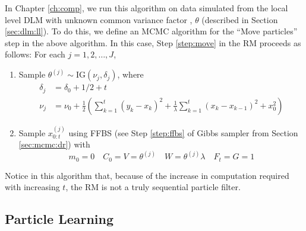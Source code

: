 In Chapter \ref{ch:comp}, we run this algorithm on data simulated from the local level DLM with unknown common variance factor , $\theta$ (described in Section \ref{sec:dlm:ll}). To do this, we define an MCMC algorithm for the ``Move particles'' step in the above algorithm. In this case, Step \ref{step:move} in the RM proceeds as follows:
For each $j = 1,2,\ldots,J$,
\begin{enumerate}
\item \label{step:move:ll} Sample $\theta^{(j)} \sim \mbox{IG}(\nu_j, \delta_j)$, where
\begin{align*}
\delta_j &= \delta_0 + 1/2 + t \\
\nu_j &= \nu_0 + \frac{1}{2}\left(\sum_{k=1}^t (y_k - x_k)^2 + \frac{1}{\lambda}\sum_{k=1}^t (x_k - x_{k-1})^2 + x_0^2\right)
\end{align*}
\item Sample $x_{0:t}^{(j)}$ using FFBS (see Step \ref{step:ffbs} of Gibbs sampler from Section \ref{sec:mcmc:dr}) with
\[m_0 = 0 \quad C_0 = V = \theta^{(j)} \quad W = \theta^{(j)}\lambda \quad F_t = G = 1\]
\end{enumerate}

Notice in this algorithm that, because of the increase in computation required with increasing $t$, the RM is not a truly sequential particle filter.

\subsection{Particle Learning \label{sec:pl}}

